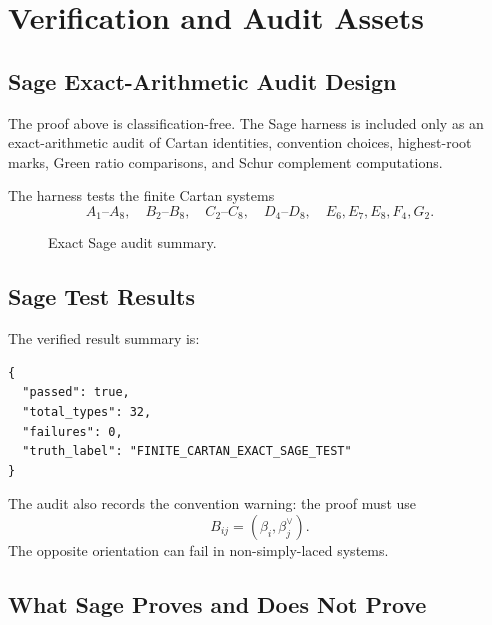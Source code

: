 \documentclass[11pt]{book}
\theoremstyle{definition}
\begin{document}
\part{Verification and Audit Assets}

\chapter{Sage Exact-Arithmetic Audit Design}
The proof above is classification-free. The Sage harness is included only as an exact-arithmetic audit of Cartan identities, convention choices, highest-root marks, Green ratio comparisons, and Schur complement computations.

The harness tests the finite Cartan systems
\[
 A_1\text{--}A_8,\quad B_2\text{--}B_8,\quad C_2\text{--}C_8,
 \quad D_4\text{--}D_8,
 \quad E_6,E_7,E_8,F_4,G_2.
\]

\begin{figure}[h]
\centering
{}
\caption{Exact Sage audit summary.}
\end{figure}

\chapter{Sage Test Results}
The verified result summary is:
\begin{lstlisting}[style=sage]
{
  "passed": true,
  "total_types": 32,
  "failures": 0,
  "truth_label": "FINITE_CARTAN_EXACT_SAGE_TEST"
}
\end{lstlisting}
The audit also records the convention warning: the proof must use
\[
 B_{ij}=(\beta_i,\beta_j^\vee).
\]
The opposite orientation can fail in non-simply-laced systems.

\chapter{What Sage Proves and Does Not Prove}
\end{document}
